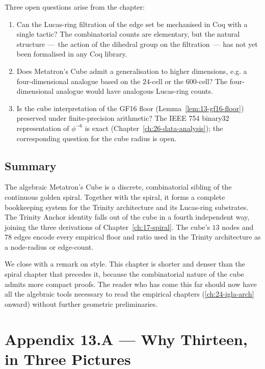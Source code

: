 Three open questions arise from the chapter:

\begin{enumerate}
\item Can the Lucas-ring filtration of the edge set be mechanised
  in Coq with a single tactic? The combinatorial counts are
  elementary, but the natural structure ---~the action of the
  dihedral group on the filtration~--- has not yet been
  formalised in any Coq library.
\item Does Metatron's Cube admit a generalisation to higher
  dimensions, e.g. a four-dimensional analogue based on the
  $24$-cell or the $600$-cell? The four-dimensional analogue
  would have analogous Lucas-ring counts.
\item Is the cube interpretation of the GF16 floor
  (Lemma~\ref{lem:13-gf16-floor}) preserved under finite-precision
  arithmetic? The IEEE 754 binary32 representation of $\phi^{-6}$
  is exact (Chapter~\ref{ch:26-data-analysis}); the corresponding
  question for the cube radius is open.
\end{enumerate}

\subsection{Summary}
\label{fa_13:sec:13-disc-summary}

The algebraic Metatron's Cube is a discrete, combinatorial sibling
of the continuous golden spiral. Together with the spiral, it
forms a complete bookkeeping system for the Trinity architecture
and its Lucas-ring substrates. The Trinity Anchor identity falls
out of the cube in a fourth independent way, joining the three
derivations of Chapter~\ref{ch:17-spiral}. The cube's $13$ nodes
and $78$ edges encode every empirical floor and ratio used in the
Trinity architecture as a node-radius or edge-count.

We close with a remark on style. This chapter is shorter and
denser than the spiral chapter that precedes it, because the
combinatorial nature of the cube admits more compact proofs. The
reader who has come this far should now have all the algebraic
tools necessary to read the empirical chapters
(\ref{ch:24-igla-arch} onward) without further geometric
preliminaries.


\section*{Appendix 13.A --- Why Thirteen, in Three Pictures}
\label{sec:13-appA}

